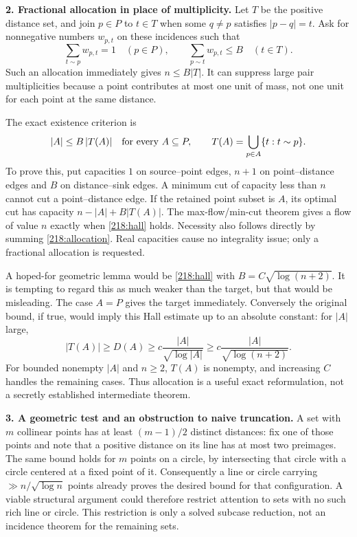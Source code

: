 \documentclass[11pt,a4paper]{article}
\numberwithin{equation}{section}
\begin{document}
\textbf{2. Fractional allocation in place of multiplicity.}
Let $T$ be the positive distance set, and join $p\in P$ to $t\in T$
when some $q\ne p$ satisfies $|p-q|=t$. Ask for nonnegative numbers
$w_{p,t}$ on these incidences such that
\begin{equation}\label{218:allocation}
 \sum_{t\sim p}w_{p,t}=1\quad(p\in P),\qquad
 \sum_{p\sim t}w_{p,t}\le B\quad(t\in T).
\end{equation}
Such an allocation immediately gives $n\le B|T|$. It can suppress large
pair multiplicities because a point contributes at most one unit of mass,
not one unit for each point at the same distance.

The exact existence criterion is
\begin{equation}\label{218:hall}
 |A|\le B\,|T(A)|\quad\hbox{for every }A\subseteq P,
 \qquad T(A)=\bigcup_{p\in A}\{t:t\sim p\}.
\end{equation}
To prove this, put capacities $1$ on source--point edges, $n+1$ on
point--distance edges and $B$ on distance--sink edges. A minimum cut of
capacity less than $n$ cannot cut a point--distance edge. If the retained
point subset is $A$, its optimal cut has capacity
$n-|A|+B|T(A)|$. The max-flow/min-cut theorem gives a flow of value $n$
exactly when \eqref{218:hall} holds. Necessity also follows directly by
summing \eqref{218:allocation}. Real capacities cause no integrality
issue; only a fractional allocation is requested.

A hoped-for geometric lemma would be \eqref{218:hall} with
$B=C\sqrt{\log(n+2)}$. It is tempting to regard this as much weaker than
the target, but that would be misleading. The case $A=P$ gives the target
immediately. Conversely the original bound, if true, would imply this
Hall estimate up to an absolute constant: for $|A|$ large,
\[
 |T(A)|\ge D(A)\ge c\frac{|A|}{\sqrt{\log |A|}}
            \ge c\frac{|A|}{\sqrt{\log(n+2)}}.
\]
For bounded nonempty $|A|$ and $n\ge2$, $T(A)$ is nonempty, and increasing
$C$ handles the remaining cases. Thus allocation is a useful exact
reformulation, not a secretly established intermediate theorem.

\textbf{3. A geometric test and an obstruction to naive truncation.}
A set with $m$ collinear points has at least $(m-1)/2$ distinct distances:
fix one of those points and note that a positive distance on its line has
at most two preimages. The same bound holds for $m$ points on a circle,
by intersecting that circle with a circle centered at a fixed point of it.
Consequently a line or circle carrying
$\gg n/\sqrt{\log n}$ points already proves the desired bound for that
configuration. A viable structural argument could therefore restrict
attention to sets with no such rich line or circle. This restriction is
only a solved subcase reduction, not an incidence theorem for the
remaining sets.
\end{document}
